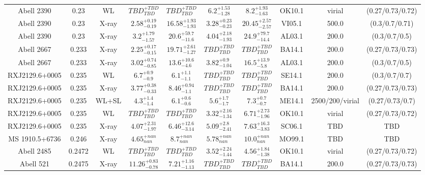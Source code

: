 \begin{table}
\begin{tabular}{cccccccccc}
Abell 2390 & 0.23 & WL & ${TBD}^{+TBD}_{TBD}$ & ${TBD}^{+TBD}_{TBD}$ & ${6.2}^{+1.53}_{-1.28}$ & ${8.2}^{+1.93}_{-1.63}$ & OK10.1 & virial & (0.27/0.73/0.72) \\
Abell 2390 & 0.23 & X-ray & ${2.58}^{+0.19}_{-0.19}$ & ${16.58}^{+1.93}_{-1.93}$ & ${3.28}^{+0.23}_{-0.23}$ & ${20.45}^{+2.57}_{-2.57}$ & VI05.1 & 500.0 & (0.3/0.7/0.71) \\
Abell 2390 & 0.23 & X-ray & ${3.2}^{+1.79}_{-1.57}$ & ${20.6}^{+59.7}_{-11.6}$ & ${4.04}^{+2.18}_{-1.93}$ & ${24.9}^{+79.7}_{-14.4}$ & AL03.1 & 200.0 & (0.3/0.7/0.5) \\
Abell 2667 & 0.233 & X-ray & ${2.25}^{+0.17}_{-0.15}$ & ${19.71}^{+2.61}_{-1.27}$ & ${TBD}^{+TBD}_{TBD}$ & ${TBD}^{+TBD}_{TBD}$ & BA14.1 & 200.0 & (0.27/0.73/0.73) \\
Abell 2667 & 0.233 & X-ray & ${3.02}^{+0.74}_{-0.85}$ & ${13.6}^{+10.6}_{-4.6}$ & ${3.82}^{+0.9}_{-1.04}$ & ${16.5}^{+13.9}_{-5.8}$ & AL03.1 & 200.0 & (0.3/0.7/0.5) \\
RXJ2129.6+0005 & 0.235 & WL & ${6.7}^{+0.9}_{-0.9}$ & ${6.1}^{+1.1}_{-1.1}$ & ${TBD}^{+TBD}_{TBD}$ & ${TBD}^{+TBD}_{TBD}$ & SE14.1 & 200.0 & (0.3/0.7/0.7) \\
RXJ2129.6+0005 & 0.235 & X-ray & ${3.77}^{+0.38}_{-0.33}$ & ${8.46}^{+0.94}_{-1.1}$ & ${TBD}^{+TBD}_{TBD}$ & ${TBD}^{+TBD}_{TBD}$ & BA14.1 & 200.0 & (0.27/0.73/0.73) \\
RXJ2129.6+0005 & 0.235 & WL+SL & ${4.3}^{+1.4}_{-1.4}$ & ${6.1}^{+0.6}_{-0.6}$ & ${5.6}^{+1.7}_{-1.7}$ & ${7.3}^{+0.7}_{-0.7}$ & ME14.1 & 2500/200/virial & (0.27/0.73/0.7) \\
RXJ2129.6+0005 & 0.235 & WL & ${TBD}^{+TBD}_{TBD}$ & ${TBD}^{+TBD}_{TBD}$ & ${3.32}^{+2.16}_{-1.34}$ & ${6.71}^{+2.73}_{-1.96}$ & OK10.1 & virial & (0.27/0.73/0.72) \\
RXJ2129.6+0005 & 0.235 & X-ray & ${4.07}^{+2.31}_{-1.97}$ & ${6.46}^{+12.6}_{-3.14}$ & ${5.09}^{+2.8}_{-2.41}$ & ${7.63}^{+16.3}_{-3.83}$ & SC06.1 & TBD & TBD \\
MS 1910.5+6736 & 0.246 & X-ray & ${4.65}^{+nan}_{nan}$ & ${8.7}^{+nan}_{nan}$ & ${5.78}^{+nan}_{nan}$ & ${10.0}^{+nan}_{nan}$ & MO99.1 & TBD & TBD \\
Abell 2485 & 0.2472 & WL & ${TBD}^{+TBD}_{TBD}$ & ${TBD}^{+TBD}_{TBD}$ & ${3.52}^{+2.24}_{-1.44}$ & ${4.56}^{+1.84}_{-1.38}$ & OK10.1 & virial & (0.27/0.73/0.72) \\
Abell 521 & 0.2475 & X-ray & ${11.26}^{+0.83}_{-0.78}$ & ${7.21}^{+1.16}_{-1.13}$ & ${TBD}^{+TBD}_{TBD}$ & ${TBD}^{+TBD}_{TBD}$ & BA14.1 & 200.0 & (0.27/0.73/0.73) \\

\end{tabular}
\end{table}

